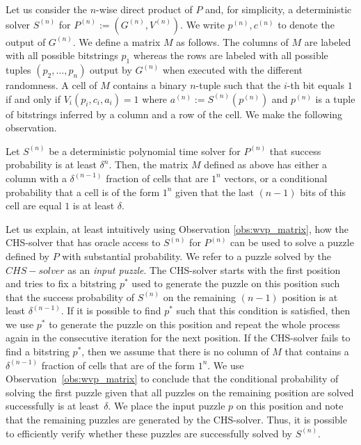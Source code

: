Let us consider the $n$-wise direct product of $P$ and, for simplicity, a deterministic solver $S^{(n)}$ for $P^{(n)} := (G^{(n)}, V^{(n)})$.
We write $p^{(n)}, c^{(n)}$ to denote the output of $G^{(n)}$.
We define a matrix $M$ as follows. The columns of $M$ are labeled with all possible bitstrings $p_1$
whereas the rows are labeled with all possible tuples $(p_2, \dotsc, p_n)$ output by $G^{(n)}$ when executed with the different randomness.
A cell of $M$ contains a binary $n$-tuple such that the $i$-th bit equals $1$ if and only if $V_i(p_i, c_i, a_i) = 1$ where
 $a^{(n)} := S^{(n)}(p^{(n)})$ and $p^{(n)}$ is a tuple of bitstrings inferred by a column and a row of the cell.
We make the following observation.
%
\begin{observation}
\label{obs:wvp_matrix}
Let $S^{(n)}$ be a deterministic polynomial time solver for $P^{(n)}$ that success probability is at least $\delta^{n}$.
Then, the matrix $M$ defined as above has either a column with a $\delta^{(n-1)}$ fraction of cells that are $1^n$ vectors, or
a conditional probability that a cell is of the form $1^n$ given that the last $(n-1)$ bits of this cell are equal $1$ is at least $\delta$.
\end{observation}
%
Let us explain, at least intuitively using Observation \ref{obs:wvp_matrix}, how the CHS-solver
that has oracle access to $S^{(n)}$ for $P^{(n)}$ can be used to solve a puzzle defined by $P$
with substantial probability.
We refer to a puzzle solved by the $CHS-solver$ as an \textit{input puzzle}.
The CHS-solver starts with the first position and tries to fix a bitstring $p^*$ used to generate the puzzle on this position such
that the success probability of $S^{(n)}$ on the remaining $(n-1)$ position is at least $\delta^{(n-1)}$.
If it is possible to find $p^*$ such that this condition is satisfied, then we use $p^*$ to generate the puzzle on this position
and repeat the whole process again in the consecutive iteration for the next position.
If the CHS-solver fails to find a bitstring $p^*$, then we assume that there is no column of $M$ that contains a $\delta^{(n-1)}$ fraction
of cells that are of the form $1^n$. We use Observation~\ref{obs:wvp_matrix} to conclude that the conditional probability of
solving the first puzzle given that all puzzles on the remaining position are solved successfully is at least~$\delta$.
We place the input puzzle $p$ on this position and note that the remaining puzzles are generated by the CHS-solver.
Thus, it is possible to efficiently verify whether these puzzles are successfully solved by $S^{(n)}$.

